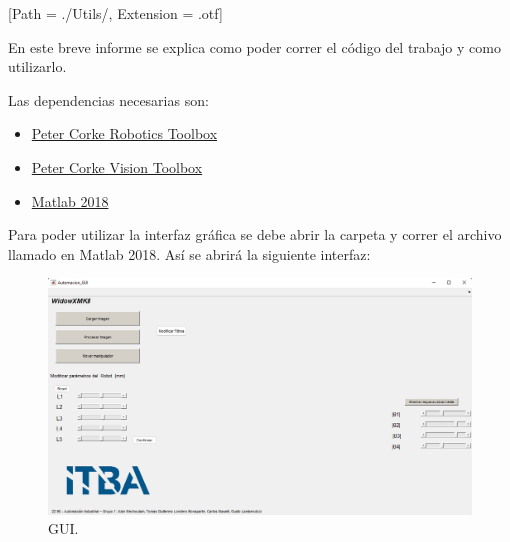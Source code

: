 



\def\verObs{0}


\setmainfont{AvenirLTStd-Roman}[Path = ./Utils/, Extension = .otf]



\setmainfont{Calibri}




En este breve informe se explica como poder correr el código del trabajo y como utilizarlo.

Las dependencias necesarias son:
\begin{itemize}
\item \href{https://petercorke.com/toolboxes/robotics-toolbox/}{Peter Corke Robotics Toolbox}
\item \href{https://petercorke.com/toolboxes/machine-vision-toolbox/}{Peter Corke Vision Toolbox}
\item \href{https://la.mathworks.com/products/matlab.html}{Matlab 2018}
\end{itemize}

Para poder utilizar la interfaz gráfica se debe abrir la carpeta  y correr el archivo llamado  en Matlab 2018. Así se abrirá la siguiente interfaz:
\begin{figure}[H]
	\centering
	\includegraphics[width=\linewidth]{GUI}
	\caption{GUI.}	
	\label{fig:GUI}
\end{figure}


